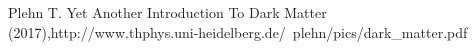 
Plehn   T.
Yet   Another   Introduction   To   Dark   Matter   (2017),http://www.thphys.uni-heidelberg.de/~plehn/pics/dark_matter.pdf